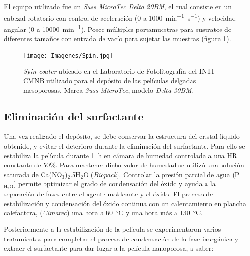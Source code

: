 			 El equipo utilizado fue un \textit{Suss MicroTec Delta 20BM}, el cual consiste en un cabezal rotatorio con control de aceleración (0 a  \SI{1000}{\minute^{-1}.\second^{-1}}) y velocidad angular (0 a \SI{10000}{\minute^{-1}}). Posee múltiples portamuestras para sustratos de diferentes tamaños con entrada de vacío para sujetar las muestras (figura \ref{fig:spin}).   		   

					\begin{figure}[ht!]
					  \begin{center}
					  \texttt{[image: Imagenes/Spin.jpg]}
					  \caption[Equipo para el depósito de películas delgadas, \textit{spin-coater}]{\textit{Spin-coater} ubicado en el Laboratorio de Fotolitografía del INTI-CMNB utilizado para el depósito de las películas delgadas mesoporosas, Marca \textit{Suss MicroTec}, modelo \textit{Delta 20BM}.}
					  \label{fig:spin}
					  \end{center}
					  \end{figure}

	\subsection{Eliminación del surfactante}\label{sec:cond_y_extr}

		Una vez realizado el depósito, se debe conservar la estructura del cristal líquido obtenido, y evitar el deterioro durante la eliminación del surfactante. Para ello se estabiliza la película durante \SI{1}{\hour} en cámara de humedad controlada a una HR constante de 50\%. Para mantener dicho valor de humedad se utilizó una solución saturada de Ca(NO$_3$)$_2$.5H$_2$O (\textit{Biopack}). Controlar la presión parcial de agua (P$_{\text{H}_2\text{O}}$) permite optimizar el grado de condensación del óxido y ayuda a la separación de fases entre el agente moldeante y el óxido\cite{Crepaldi2003}. El proceso de estabilización y condensación del óxido continua con un calentamiento en plancha calefactora, (\textit{Cimarec}) una hora a \SI{60}{\celsius} y una hora más a \SI{130}{\celsius}\cite{Crepaldi2003,Crepaldi2002a}. 
				
		Posteriormente a la estabilización de la película se experimentaron varios tratamientos para completar el proceso de condensación de la fase inorgánica y extraer el surfactante para dar lugar a la película nanoporosa, a saber:


